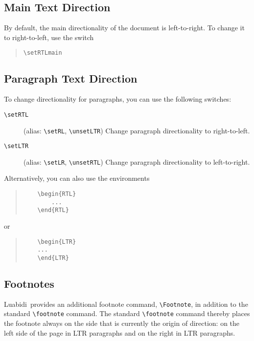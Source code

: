 \documentclass{article}
\newcommand*\Lbd{\textsf{Luabidi}}
\newcommand*{\cmd}[1]{\texttt{\textbackslash #1}}
\begin{document}
\subsection{Main Text Direction}

By default, the main directionality of the document is left-to-right. To change it to right-to-left, use the switch

\begin{quote}
	\cmd{setRTLmain}
\end{quote}

\subsection{Paragraph Text Direction}

To change directionality for paragraphs, you can use the following switches:
\begin{description}
	\item[\cmd{setRTL}] (alias: \cmd{setRL}, \cmd{unsetLTR}) Change paragraph directionality to right-to-left.
	\item[\cmd{setLTR}] (alias: \cmd{setLR}, \cmd{unsetRTL}) Change paragraph directionality to left-to-right.
\end{description}
%
Alternatively, you can also use the environments

\begin{quote}
	\begin{verbatim}
	\begin{RTL}
		...
	\end{RTL}
	\end{verbatim}
\end{quote}
%
or

\begin{quote}
	\begin{verbatim}
	\begin{LTR}
	...
	\end{LTR}
	\end{verbatim}
\end{quote}
 
\subsection{Footnotes}

\Lbd\ provides an additional footnote command, \cmd{Footnote}, in addition to the standard \cmd{footnote} command.
The standard \cmd{footnote} command thereby places the footnote always on the side that is currently the origin of direction:
on the left side of the page in LTR paragraphs and on the right in LTR paragraphs.
\end{document}
